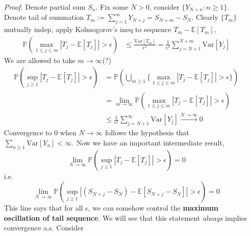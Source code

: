 \documentclass[a4paper,12pt,twoside]{book}
\begin{document}
\begin{itemize}
	\item[\textit{Proof.}] Denote partial sum $S_n$. Fix some $N>0$, consider $\{Y_{N+n}:n\geq 1\}$. Denote tail of summation $T_m := \sum_{j=1}^m Y_{N+j}=S_{N+m}-S_N$.\newline
	Clearly $\{T_m\}$ mutually indep, apply Kolmogorov's ineq to sequence $T_m - \mathbb{E}\left[T_m\right]$,
	\begin{equation}
		\begin{split}
			\mathbb{P}\left(\max\limits_{1\leq j\leq m}|T_j- \mathbb{E}\left[T_j\right]|>\epsilon\right)&\leq \frac{\mathrm{Var}\left[T_m\right]}{\epsilon^2}=\frac{1}{\epsilon^2}\sum_{j=N+1}^{N+m}\mathrm{Var}\left[Y_j\right]
		\end{split}
	\end{equation}
	We are allowed to take $m\to \infty$(?)
	\begin{equation}
		\begin{split}
			\mathbb{P}\left(\sup\limits_{ j\geq 1}|T_j- \mathbb{E}\left[T_j\right]|>\epsilon\right)&=\mathbb{P}\left(\bigcup_{m\geq 1}\{\max\limits_{1\leq j\leq m}|T_j- \mathbb{E}\left[T_j\right]|>\epsilon\}\right)\\
			&=\lim\limits_{m\rightarrow\infty}\mathbb{P}\left(\max\limits_{1\leq j\leq m}|T_j- \mathbb{E}\left[T_j\right]|>\epsilon\right)\\
			&\leq \frac{1}{\epsilon^2}\sum_{j=N+1}^{\infty}\mathrm{Var}\left[Y_j\right]\xrightarrow{N\to \infty}0
		\end{split}
	\end{equation}
	Convergence to 0 when $N\to \infty$ follows the hypothesis that $\sum_{n\geq1}\mathrm{Var}\left[Y_n\right]<\infty$.\newline
	Now we have an important intermediate result,
	\begin{equation}
		\lim\limits_{N\rightarrow\infty}\mathbb{P}\left(\sup\limits_{ j\geq 1}|T_j- \mathbb{E}\left[T_j\right]|>\epsilon\right)=0
	\end{equation}
	i.e. 
	\begin{equation}
		\lim\limits_{N\rightarrow\infty}\mathbb{P}\left(\sup\limits_{ j\geq 1}|(S_{N+j}-S_N)- \mathbb{E}\left[S_{N+j}-S_N\right]|>\epsilon\right)=0
	\end{equation}
	This line says that for all $\epsilon$, we can somehow control the \textbf{maximum oscillation of tail sequence}. We will see that this statement \textit{always} implies convergence a.s. Consider
	\begin{equation}
		\begin{split}

\end{split}
\end{equation}
\end{itemize}
\end{document}
